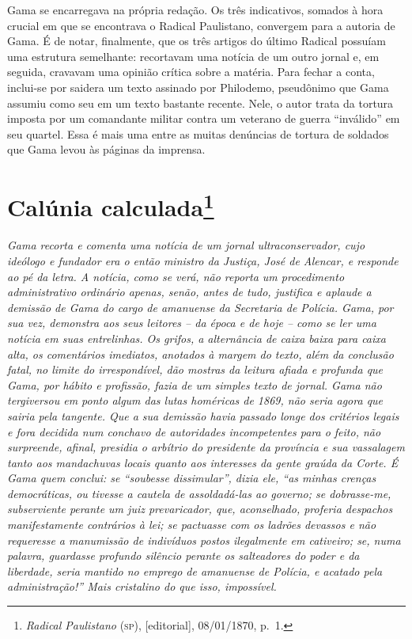 \begin{argumento}
Gama se encarregava na própria redação. Os três indicativos, somados à
hora crucial em que se encontrava o \textnormal{Radical Paulistano}, convergem
para a autoria de Gama. É de notar, finalmente, que os três artigos do
último Radical possuíam uma estrutura semelhante: recortavam uma notícia
de um outro jornal e, em seguida, cravavam uma opinião crítica sobre a
matéria. Para fechar a conta, inclui-se por saidera um texto assinado
por Philodemo, pseudônimo que Gama assumiu como seu em um texto bastante
recente. Nele, o autor trata da tortura imposta por um comandante
militar contra um veterano de guerra ``inválido'' em seu quartel. Essa é
mais uma entre as muitas denúncias de tortura de soldados que Gama levou
às páginas da imprensa.
\end{argumento}


\chapter{Calúnia calculada\footnote{\emph{Radical Paulistano} (\textsc{sp}), {[}editorial{]}, 08/01/1870, p.~1.}} %

\begin{didascalia}

\emph{Gama recorta e comenta uma notícia de um jornal ultraconservador,
cujo ideólogo e fundador era o então ministro da Justiça, José de
Alencar, e responde ao pé da letra. A notícia, como se verá, não reporta
um procedimento administrativo ordinário apenas, senão, antes de tudo,
justifica e aplaude a demissão de Gama do cargo de amanuense da
Secretaria de Polícia. Gama, por sua vez, demonstra aos seus leitores --
da época e de hoje -- como se ler uma notícia em suas entrelinhas. Os
grifos, a alternância de caixa baixa para caixa alta, os comentários
imediatos, anotados à margem do texto, além da conclusão fatal, no
limite do irrespondível, dão mostras da leitura afiada e profunda que
Gama, por hábito e profissão, fazia de um simples texto de jornal. Gama
não tergiversou em ponto algum das lutas homéricas de 1869, não seria
agora que sairia pela tangente. Que a sua demissão havia passado longe
dos critérios legais e fora decidida num conchavo de autoridades
incompetentes para o feito, não surpreende, afinal, presidia o arbítrio
do presidente da província e sua vassalagem tanto aos mandachuvas locais
quanto aos interesses da gente graúda da Corte. É Gama quem conclui: se
``soubesse dissimular'', dizia ele, ``as minhas crenças democráticas, ou
tivesse a cautela de assoldadá-las ao governo; se dobrasse-me,
subserviente perante um juiz prevaricador, que, aconselhado, proferia
despachos manifestamente contrários à lei; se pactuasse com os ladrões
devassos e não requeresse a manumissão de indivíduos postos ilegalmente
em cativeiro; se, numa palavra, guardasse profundo silêncio perante os
salteadores do poder e da liberdade, seria mantido no emprego de
amanuense de Polícia, e acatado pela administração!'' Mais cristalino do
que isso, impossível.}
\end{didascalia}


